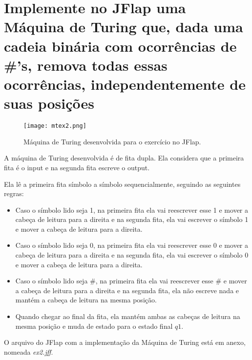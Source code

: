 \section{
    Implemente no JFlap uma Máquina de Turing que, dada uma cadeia binária com ocorrências de \#’s, remova todas essas ocorrências, independentemente de suas posições
    }

\setlength{\parindent}{4em}
\setlength{\parskip}{0.5em}
\renewcommand{\baselinestretch}{1}

\begin{figure}[h]
    \centering
    \texttt{[image: mtex2.png]}
    \caption{Máquina de Turing desenvolvida para o exercício no JFlap.}
    \label{fig:mtex2}
\end{figure}

A máquina de Turing desenvolvida é de fita dupla. Ela considera que a primeira fita é o input e na segunda fita escreve o output.

Ela lê a primeira fita símbolo a símbolo sequencialmente, seguindo as seguintes regras:
\begin{itemize}
    \item Caso o símbolo lido seja 1, na primeira fita ela vai reescrever esse 1 e mover a cabeça de leitura para a direita e na segunda fita, ela vai escrever o símbolo 1 e mover a cabeça de leitura para a direita.
    
    \item Caso o símbolo lido seja 0, na primeira fita ela vai reescrever esse 0 e mover a cabeça de leitura para a direita e na segunda fita, ela vai escrever o símbolo 0 e mover a cabeça de leitura para a direita.

    \item Caso o símbolo lido seja \#, na primeira fita ela vai reescrever esse \# e mover a cabeça de leitura para a direita e na segunda fita, ela não escreve nada e mantém a cabeça de leitura na mesma posição.

    \item Quando chegar ao final da fita, ela mantém ambas as cabeças de leitura na mesma posição e muda de estado para o estado final \(q1\).
\end{itemize}

O arquivo do JFlap com a implementação da Máquina de Turing está em anexo, nomeada \textit{ex2.jff}.
